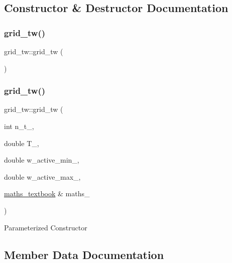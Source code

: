 \subsection{Constructor \& Destructor Documentation}
\mbox{\label{classgrid__tw_af1e2316561c84a2262e374600895010d}} 
\subsubsection{\texorpdfstring{grid\+\_\+tw()}{grid\_tw()}\hspace{0.1cm}{\footnotesize\ttfamily [1/2]}}
{\footnotesize\ttfamily grid\+\_\+tw\+::grid\+\_\+tw (\begin{DoxyParamCaption}{ }\end{DoxyParamCaption})}

\mbox{\label{classgrid__tw_a583d4c2b423305ef3806d6221ed3f543}} 
\subsubsection{\texorpdfstring{grid\+\_\+tw()}{grid\_tw()}\hspace{0.1cm}{\footnotesize\ttfamily [2/2]}}
{\footnotesize\ttfamily grid\+\_\+tw\+::grid\+\_\+tw (\begin{DoxyParamCaption}\item[{int}]{n\+\_\+t\+\_\+,  }\item[{double}]{T\+\_\+,  }\item[{double}]{w\+\_\+active\+\_\+min\+\_\+,  }\item[{double}]{w\+\_\+active\+\_\+max\+\_\+,  }\item[{\hyperlink{classmaths__textbook}{maths\+\_\+textbook} \&}]{maths\+\_\+ }\end{DoxyParamCaption})}

Parameterized Constructor 

\subsection{Member Data Documentation}
\mbox{\label{classgrid__tw_a1fbf854a0f7bd025aa98671009602c5c}} 
